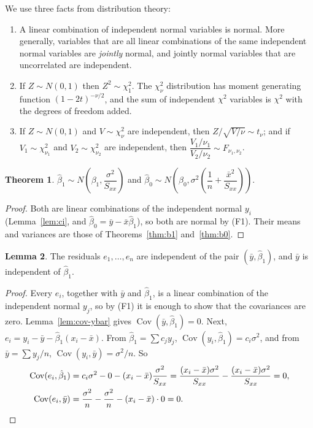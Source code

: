 \documentclass[11pt,a4paper]{article}
\numberwithin{equation}{section}
\theoremstyle{definition}
\newtheorem{thm}{Theorem}[subsection]
\newtheorem{lem}[thm]{Lemma}
\begin{document}
We use three facts from distribution theory:
\begin{enumerate}[label=(F\arabic*)]
\item A linear combination of independent normal variables is normal. More generally,
variables that are all linear combinations of the same independent normal variables are
\emph{jointly} normal, and jointly normal variables that are uncorrelated are independent.
\item If $Z \sim N(0,1)$ then $Z^2 \sim \chi^2_1$. The $\chi^2_\nu$ distribution has moment
generating function $(1 - 2t)^{-\nu/2}$, and the sum of independent $\chi^2$ variables is
$\chi^2$ with the degrees of freedom added.
\item If $Z \sim N(0,1)$ and $V \sim \chi^2_\nu$ are independent, then
$Z \big/ \sqrt{V/\nu} \sim t_\nu$; and if $V_1 \sim \chi^2_{\nu_1}$ and $V_2 \sim \chi^2_{\nu_2}$
are independent, then $\dfrac{V_1/\nu_1}{V_2/\nu_2} \sim F_{\nu_1, \nu_2}$.
\end{enumerate}

\begin{thm}\label{thm:normal-b}
$\hat\beta_1 \sim N\!\left(\beta_1, \dfrac{\sigma^2}{S_{xx}}\right)$ and
$\hat\beta_0 \sim N\!\left(\beta_0, \sigma^2\left(\dfrac1n + \dfrac{\bar x^2}{S_{xx}}\right)\right)$.
\end{thm}

\begin{proof}
Both are linear combinations of the independent normal $y_i$ (Lemma~\ref{lem:ci}, and
$\hat\beta_0 = \bar y - \bar x \hat\beta_1$), so both are normal by (F1). Their means and
variances are those of Theorems~\ref{thm:b1} and~\ref{thm:b0}.
\end{proof}

\begin{lem}\label{lem:resid-indep}
The residuals $e_1, \dots, e_n$ are independent of the pair $(\bar y, \hat\beta_1)$, and $\bar y$
is independent of $\hat\beta_1$.
\end{lem}

\begin{proof}
Every $e_i$, together with $\bar y$ and $\hat\beta_1$, is a linear combination of the
independent normal $y_j$, so by (F1) it is enough to show that the covariances are zero.
Lemma~\ref{lem:cov-ybar} gives $\operatorname{Cov}(\bar y, \hat\beta_1) = 0$. Next,
$e_i = y_i - \bar y - \hat\beta_1 (x_i - \bar x)$. From $\hat\beta_1 = \sum c_j y_j$,
$\operatorname{Cov}(y_i, \hat\beta_1) = c_i \sigma^2$, and from $\bar y = \sum y_j/n$,
$\operatorname{Cov}(y_i, \bar y) = \sigma^2/n$. So
\begin{align*}
\operatorname{Cov}(e_i, \hat\beta_1) &= c_i\sigma^2 - 0 - (x_i - \bar x)\frac{\sigma^2}{S_{xx}}
  = \frac{(x_i - \bar x)\sigma^2}{S_{xx}} - \frac{(x_i - \bar x)\sigma^2}{S_{xx}} = 0, \\
\operatorname{Cov}(e_i, \bar y) &= \frac{\sigma^2}{n} - \frac{\sigma^2}{n} - (x_i - \bar x) \cdot 0 = 0 . \qedhere
\end{align*}
\end{proof}
\end{document}
